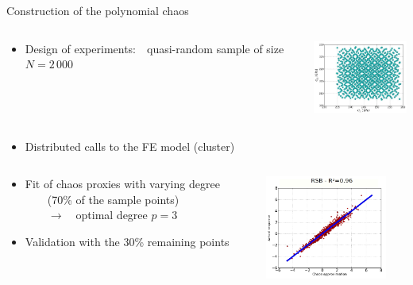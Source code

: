 \documentclass[9pt]{beamer}
\newcommand{\titx}{\usebeamercolor[fg]{subtitle}}
\begin{document}
\begin{frame}{Construction of the polynomial chaos}
    
    \small
    
    
    \begin{columns}%
        \begin{column}{7.0cm}
            \begin{itemize}
                \item Design of experiments:~~{\titx quasi-random sample} of 
                size $N=2\, 000$
            \end{itemize}
        \end{column}
        \begin{column}{3.5cm}
            \includegraphics[width=3.5cm]{../Pics/QMC.jpg}
        \end{column}
    \end{columns}
    
    \vspace{0.5cm}
    
    \begin{itemize}
        \item Distributed calls to the FE model (cluster)
    \end{itemize}
    
    \vspace{0.5cm}
    
    \begin{columns}%
        \begin{column}{7.0cm}
            \begin{itemize}
                \item Fit of chaos proxies with varying degree \\
                ~~~~(70\% of the sample points) \\
                ~~~~$\rightarrow$~~optimal degree $p=3$
                \item Validation with the 30\% remaining points
            \end{itemize}
        \end{column}
        \begin{column}{3.5cm}
            \includegraphics[width=4.0cm]{../Pics/RSB_chaos.jpg}
        \end{column}
    \end{columns}

\end{frame}
\end{document}
